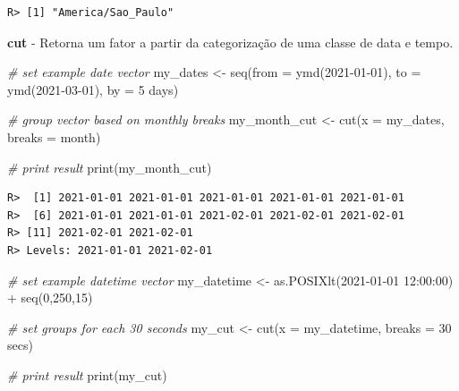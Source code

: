 \documentclass[
  11pt,
]{book}
\newenvironment{Shaded}{\begin{snugshade}}{\end{snugshade}}
\newcommand{\AttributeTok}[1]{\textcolor[rgb]{0.61,0.61,0.61}{#1}}
\newcommand{\CommentTok}[1]{\textcolor[rgb]{0.37,0.37,0.37}{\textit{#1}}}
\newcommand{\DecValTok}[1]{\textcolor[rgb]{0.06,0.06,0.06}{#1}}
\newcommand{\FunctionTok}[1]{\textcolor[rgb]{0,0,0}{#1}}
\newcommand{\NormalTok}[1]{#1}
\newcommand{\OtherTok}[1]{\textcolor[rgb]{0.37,0.37,0.37}{#1}}
\newcommand{\SpecialCharTok}[1]{\textcolor[rgb]{0,0,0}{#1}}
\newcommand{\StringTok}[1]{\textcolor[rgb]{0.5,0.5,0.5}{#1}}
\begin{document}
\begin{verbatim}
R> [1] "America/Sao_Paulo"
\end{verbatim}

\textbf{cut} - Retorna um fator a partir da categorização de uma classe de data e tempo.

\begin{Shaded}
\begin{Highlighting}[]
\CommentTok{\# set example date vector}
\NormalTok{my\_dates }\OtherTok{\textless{}{-}} \FunctionTok{seq}\NormalTok{(}\AttributeTok{from =} \FunctionTok{ymd}\NormalTok{(}\StringTok{\textquotesingle{}2021{-}01{-}01\textquotesingle{}}\NormalTok{),}
                \AttributeTok{to =} \FunctionTok{ymd}\NormalTok{(}\StringTok{\textquotesingle{}2021{-}03{-}01\textquotesingle{}}\NormalTok{),}
                \AttributeTok{by =} \StringTok{\textquotesingle{}5 days\textquotesingle{}}\NormalTok{)}

\CommentTok{\# group vector based on monthly breaks}
\NormalTok{my\_month\_cut }\OtherTok{\textless{}{-}} \FunctionTok{cut}\NormalTok{(}\AttributeTok{x =}\NormalTok{ my\_dates,}
                    \AttributeTok{breaks =} \StringTok{\textquotesingle{}month\textquotesingle{}}\NormalTok{)}

\CommentTok{\# print result}
\FunctionTok{print}\NormalTok{(my\_month\_cut)}
\end{Highlighting}
\end{Shaded}

\begin{verbatim}
R>  [1] 2021-01-01 2021-01-01 2021-01-01 2021-01-01 2021-01-01
R>  [6] 2021-01-01 2021-01-01 2021-02-01 2021-02-01 2021-02-01
R> [11] 2021-02-01 2021-02-01
R> Levels: 2021-01-01 2021-02-01
\end{verbatim}

\begin{Shaded}
\begin{Highlighting}[]
\CommentTok{\# set example datetime vector}
\NormalTok{my\_datetime }\OtherTok{\textless{}{-}} \FunctionTok{as.POSIXlt}\NormalTok{(}\StringTok{\textquotesingle{}2021{-}01{-}01 12:00:00\textquotesingle{}}\NormalTok{) }\SpecialCharTok{+} \FunctionTok{seq}\NormalTok{(}\DecValTok{0}\NormalTok{,}\DecValTok{250}\NormalTok{,}\DecValTok{15}\NormalTok{)}

\CommentTok{\# set groups for each 30 seconds}
\NormalTok{my\_cut }\OtherTok{\textless{}{-}} \FunctionTok{cut}\NormalTok{(}\AttributeTok{x =}\NormalTok{ my\_datetime, }\AttributeTok{breaks =} \StringTok{\textquotesingle{}30 secs\textquotesingle{}}\NormalTok{)}

\CommentTok{\# print result}
\FunctionTok{print}\NormalTok{(my\_cut)}
\end{Highlighting}
\end{Shaded}
\end{document}
